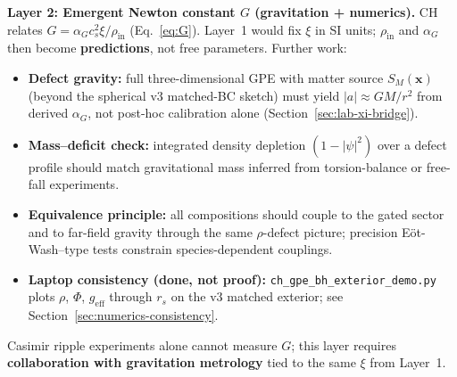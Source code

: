 \documentclass[11pt,a4paper]{article}
\begin{document}
\textbf{Layer 2: Emergent Newton constant $G$ (gravitation + numerics).}
CH relates $G = \alpha_G c_s^2 \xi / \rho_{\mathrm{in}}$ (Eq.~\ref{eq:G}).
Layer~1 would fix $\xi$ in SI units; $\rho_{\mathrm{in}}$ and $\alpha_G$ then become \textbf{predictions}, not free parameters.
Further work:
\begin{itemize}[leftmargin=*]
  \item \textbf{Defect gravity:} full three-dimensional GPE with matter source $S_M(\mathbf{x})$ (beyond the spherical v3 matched-BC sketch) must yield $|a| \approx GM/r^2$ from derived $\alpha_G$, not post-hoc calibration alone (Section~\ref{sec:lab-xi-bridge}).
  \item \textbf{Mass--deficit check:} integrated density depletion $(1-|\psi|^2)$ over a defect profile should match gravitational mass inferred from torsion-balance or free-fall experiments.
  \item \textbf{Equivalence principle:} all compositions should couple to the gated sector and to far-field gravity through the same $\rho$-defect picture; precision E\"ot-Wash--type tests constrain species-dependent couplings.
  \item \textbf{Laptop consistency (done, not proof):} \texttt{ch\_gpe\_bh\_exterior\_demo.py} plots $\rho$, $\Phi$, $g_{\mathrm{eff}}$ through $r_s$ on the v3 matched exterior; see Section~\ref{sec:numerics-consistency}.
\end{itemize}
Casimir ripple experiments alone cannot measure $G$; this layer requires \textbf{collaboration with gravitation metrology} tied to the same $\xi$ from Layer~1.
\end{document}
